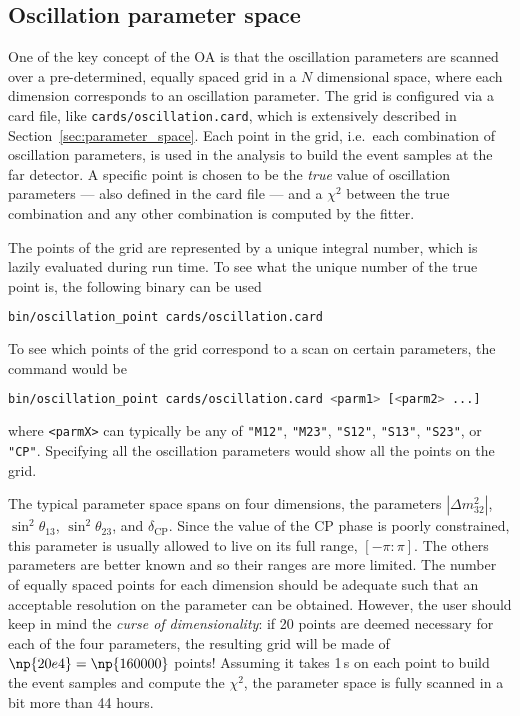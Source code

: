 \documentclass[a4paper, 11pt]{article}
\newcommand{\refsec}[1]{Section~\ref{#1}}
\begin{document}
\subsection{Oscillation parameter space}

One of the key concept of the OA is that the oscillation parameters are scanned over %
a pre-determined, equally spaced grid in a $N$ dimensional space, %
where each dimension corresponds to an oscillation parameter.
The grid is configured via a card file, like \texttt{cards/oscillation.card}, which %
is extensively described in \refsec{sec:parameter_space}.
Each point in the grid, i.e.\ each combination of oscillation parameters, is used in %
the analysis to build the event samples at the far detector.
A specific point is chosen to be the \emph{true} value of oscillation parameters %
--- also defined in the card file --- and a $\chi^2$ between the true combination %
and any other combination is computed by the fitter.

The points of the grid are represented by a unique integral number, %
which is lazily evaluated during run time.
To see what the unique number of the true point is, the following binary can be used
\begin{lstlisting}[language=bash]
    bin/oscillation_point cards/oscillation.card
\end{lstlisting}
To see which points of the grid correspond to a scan on certain parameters, 
the command would be
\begin{lstlisting}[language=bash]
    bin/oscillation_point cards/oscillation.card <parm1> [<parm2> ...]
\end{lstlisting}
where \texttt{<parmX>} can typically be any of \texttt{"M12"}, \texttt{"M23"}, \texttt{"S12"}, %
\texttt{"S13"}, \texttt{"S23"}, or \texttt{"CP"}.
Specifying all the oscillation parameters would show all the points on the grid.

The typical parameter space spans on four dimensions, the parameters %
$|\Delta m^2_{32}|$, $\sin^2 \theta_{13}$, $\sin^2 \theta_{23}$, and $\delta_\text{CP}$.
Since the value of the CP phase is poorly constrained, this parameter is usually %
allowed to live on its full range, $[-\pi:\pi]$.
The others parameters are better known and so their ranges are more limited.
The number of equally spaced points for each dimension should be adequate such that %
an acceptable resolution on the parameter can be obtained.
However, the user should keep in mind the \emph{curse of dimensionality}: %
if 20 points are deemed necessary for each of the four parameters, the resulting %
grid will be made of $\np{20e4} = \np{160000}$ points!
Assuming it takes 1\,s on each point to build the event samples and compute the $\chi^2$, %
the parameter space is fully scanned in a bit more than 44 hours.
\end{document}
